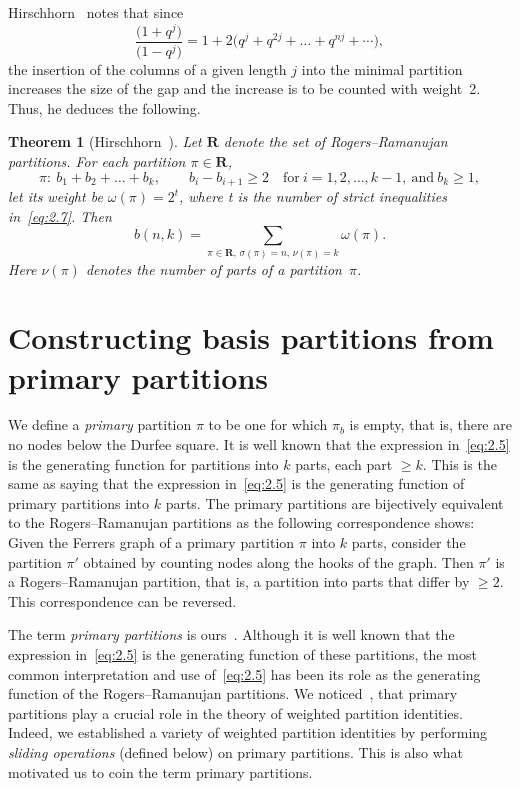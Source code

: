\documentclass[10pt,a4paper]{amsart}
\numberwithin{equation}{section}
\newtheorem{Theorem}{Theorem}[section]
\theoremstyle{definition}
\begin{document}
Hirschhorn~\cite{Hi0099} notes that since
\begin{equation*}
\frac{\bigl(1+q^j\bigr)}{\bigl(1-q^j\bigr)}=1+2\bigl(q^j+q^{2j}+\dots +q^{nj}+\cdots \bigr),%
\end{equation*}
the insertion of the columns of a given length $j$ into the minimal
partition increases the size of the gap and the increase is to be counted
with weight~2. Thus, he deduces the following.

\begin{Theorem}[{Hirschhorn~\cite{Hi0099}}]\label{thm:1}
Let $\mathbf{R}$ denote the set of Rogers--Ramanujan partitions. For
each partition $\pi\in \mathbf{R}$,
\begin{equation}
\pi\colon\ b_1+b_2+\dots +b_k, \qquad b_i-b_{i+1}\ge 2 \quad \text{for} \
i=1,2,\dots , k-1, \ \text{and} \ b_k\ge 1, \label{eq:2.7}
\end{equation}
let its weight be $\omega(\pi)=2^t$, where t is the number of
strict inequalities in~\eqref{eq:2.7}. Then
\[
b(n,k)=\sum_{\pi\in \mathbf{R},\, \sigma(\pi)=n,\, \nu(\pi)=k}\omega(\pi).
\]
Here $\nu(\pi)$ denotes the number of parts of a partition~$\pi$.
\end{Theorem}


\section{Constructing basis partitions from primary partitions}\label{section3}

We define a {\it primary} partition $\pi$ to be one for which $\pi_b$ is
empty, that is, there are no nodes below the Durfee square. It is well known
\cite{An-book} that the expression in~\eqref{eq:2.5} is the generating function for partitions
into $k$ parts, each part $\ge k$. This is the same as saying that the
expression in~\eqref{eq:2.5} is the generating function of primary partitions into
$k$ parts. The primary partitions are bijectively equivalent to the
Rogers--Ramanujan partitions as the following correspondence shows: Given
the Ferrers graph of a primary partition $\pi$ into $k$ parts, consider
the partition $\pi'$ obtained by counting nodes along the hooks of the
graph. Then $\pi'$ is a Rogers--Ramanujan partition, that is, a partition
into parts that differ by $\ge 2$. This correspondence can be reversed.

The term {\it primary partitions} is ours~\cite{Al0097}. Although it is well known that
the expression in~\eqref{eq:2.5} is the generating function of these partitions,
the most common interpretation and use of~\eqref{eq:2.5} has been
its role as the generating function of the Rogers--Ramanujan partitions.
We noticed~\cite{Al0097,Al0098}, that primary partitions play a crucial role in the
theory of weighted partition identities. Indeed, we established a variety
of weighted partition identities by performing {\it sliding operations}
(defined below) on primary partitions. This is also what motivated us to
coin the term primary partitions.
\end{document}
